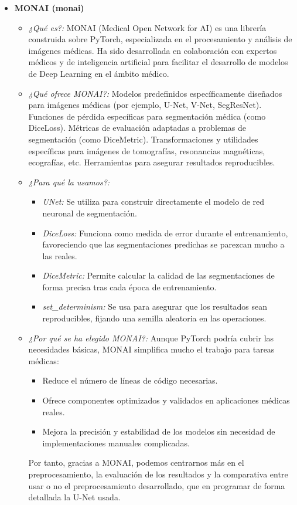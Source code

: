 \documentclass[12pt]{article}
\begin{document}
\begin{itemize}
    \item \textbf{MONAI (monai)} \cite{monai}
    \begin{itemize}
        \item \textit{¿Qué es?:} MONAI (Medical Open Network for AI) es una librería construida sobre PyTorch, especializada en el procesamiento y análisis de imágenes médicas. Ha sido desarrollada en colaboración con expertos médicos y de inteligencia artificial para facilitar el desarrollo de modelos de Deep Learning en el ámbito médico.
        \item \textit{¿Qué ofrece MONAI?:} Modelos predefinidos específicamente diseñados para imágenes médicas (por ejemplo, U-Net, V-Net, SegResNet). Funciones de pérdida específicas para segmentación médica (como DiceLoss). Métricas de evaluación adaptadas a problemas de segmentación (como DiceMetric). Transformaciones y utilidades específicas para imágenes de tomografías, resonancias magnéticas, ecografías, etc. Herramientas para asegurar resultados reproducibles.
        \item \textit{¿Para qué la usamos?:}
        \begin{itemize}
            \item \textit{UNet:} Se utiliza para construir directamente el modelo de red neuronal de segmentación.
            \item \textit{DiceLoss:} Funciona como medida de error durante el entrenamiento, favoreciendo que las segmentaciones predichas se parezcan mucho a las reales.
            \item \textit{DiceMetric:} Permite calcular la calidad de las segmentaciones de forma precisa tras cada época de entrenamiento.
            \item \textit{set\_determinism:} Se usa para asegurar que los resultados sean reproducibles, fijando una semilla aleatoria en las operaciones.
        \end{itemize}
        \item \textit{¿Por qué se ha elegido MONAI?:} Aunque PyTorch podría cubrir las necesidades básicas, MONAI simplifica mucho el trabajo para tareas médicas:
        \begin{itemize}
            \item Reduce el número de líneas de código necesarias.
            \item Ofrece componentes optimizados y validados en aplicaciones médicas reales.
            \item Mejora la precisión y estabilidad de los modelos sin necesidad de implementaciones manuales complicadas.
        \end{itemize}
        Por tanto, gracias a MONAI, podemos centrarnos más en el preprocesamiento, la evaluación de los resultados y la comparativa entre usar o no el preprocesamiento desarrollado, que en programar de forma detallada la U-Net usada.
    \end{itemize}


\end{itemize}
\end{document}
